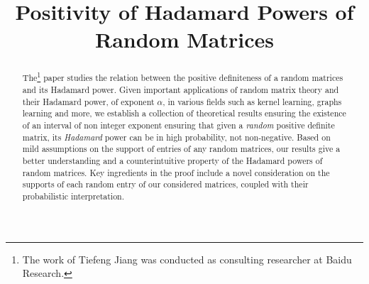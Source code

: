 \documentclass[conference,letterpaper]{IEEEtran}
\numberwithin{equation}{section}
\begin{document}
\title{Positivity of Hadamard Powers of Random Matrices}


\author{%
  \and
}



\maketitle


\begin{abstract}
\noindent The\footnote{The work of Tiefeng Jiang was conducted as consulting researcher at Baidu Research.} paper studies the relation between the positive definiteness of a random matrices and its Hadamard power.
Given important applications of random matrix theory and their Hadamard power, of exponent $\alpha$, in various fields such as kernel learning, graphs learning and more, we establish a collection of theoretical results ensuring the existence of an interval of non integer exponent ensuring that given a \emph{random} positive definite matrix, its \emph{Hadamard} power can be in high probability, not non-negative.
Based on mild assumptions on the support of entries of any random matrices, our results give a better understanding and a counterintuitive property of the Hadamard powers of random matrices.
Key ingredients in the proof include a novel consideration on the supports of each random entry of our considered matrices, coupled with their probabilistic interpretation.\\
\end{abstract}
\end{document}
